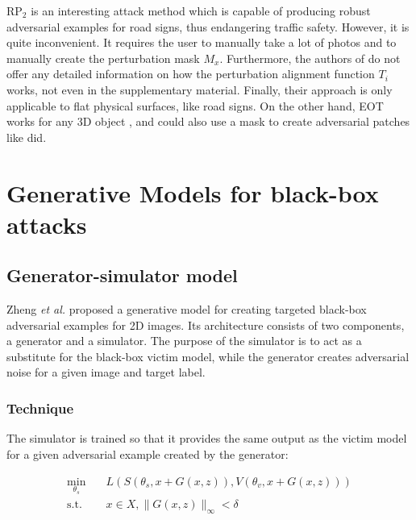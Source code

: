 $\textrm{RP}_2$ is an interesting attack method which is capable of producing robust adversarial examples for road signs, thus endangering traffic safety. However, it is quite inconvenient. It requires the user to manually take a lot of photos and to manually create the perturbation mask $M_x$. Furthermore, the authors of \cite{evtimov_road_signs} do not offer any detailed information on how the perturbation alignment function $T_i$ works, not even in the supplementary material. Finally, their approach is only applicable to flat physical surfaces, like road signs. On the other hand, EOT works for any 3D object \cite{athalye}, and could also use a mask to create adversarial patches like \cite{evtimov_road_signs} did.

\section{Generative Models for black-box attacks}
    \label{sec:generative_models}
    
\subsection{Generator-simulator model}
    \label{subsubsec:zheng}

Zheng \textit{et al.} \cite{zheng_black_box_GAN} proposed a generative model for creating targeted black-box adversarial examples for 2D images. Its architecture consists of two components, a generator and a simulator. The purpose of the simulator is to act as a substitute for the black-box victim model, while the generator creates adversarial noise for a given image and target label.

\subsubsection{Technique}

The simulator is trained so that it provides the same output as the victim model for a given adversarial example created by the generator:

\begin{equation}
\begin{aligned}
\min_{\theta_s} \quad & L(S(\theta_s, x + G(x, z)),V(\theta_v, x + G(x, z)))\\
\textrm{s.t.} \quad & x \in X, \|G(x, z)\|_\infty < \delta
\label{eq:simulator_loss}
\end{aligned}
\end{equation}

